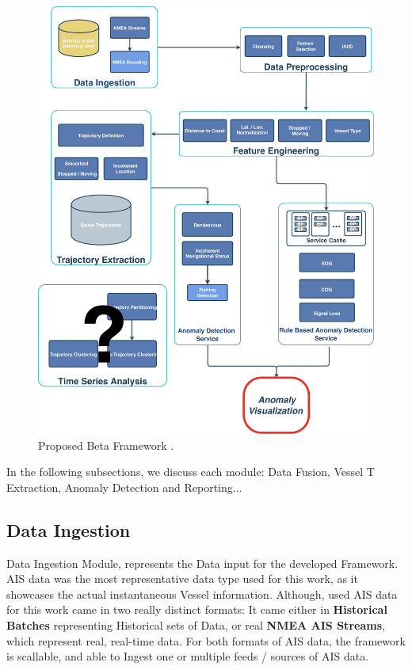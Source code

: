 \begin{figure}[H]
	\centering
	\includegraphics[scale = .35]{figures/Ch3/Framework.pdf}
    \caption{Proposed Beta Framework .}
    \label{fig:Framework}
\end{figure}

In the following subsections, we discuss each module: Data Fusion, Vessel T Extraction, Anomaly Detection and Reporting...

\subsection{Data Ingestion}
Data Ingestion Module, represents the Data input for the developed Framework. AIS data was the most representative data type used for this work, as it showcases the actual instantaneous Vessel information.
Although, used AIS data for this work came in two really distinct formats: It came either in \textbf{Historical Batches} representing Historical sets of Data, or real \textbf{NMEA AIS Streams}, which represent real, real-time data. For both formats of AIS data, the framework is scallable, and able to Ingest one or multiple feeds / sources of AIS data.

